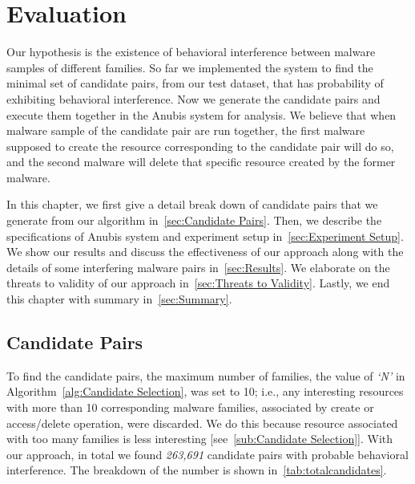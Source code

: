 \chapter{Evaluation}
\label{chapter:evaluation}
Our hypothesis is the existence of behavioral interference between malware samples of different families.
So far we implemented the system to find the minimal set of candidate pairs, from our test dataset, that has probability of exhibiting behavioral interference.
Now we generate the candidate pairs and execute them together in the Anubis system for analysis.
We believe that when malware sample of the candidate pair are run together, the first malware supposed to create the resource corresponding to the candidate pair will do so, and the second malware will delete that specific resource created by the former malware.

In this chapter, we first give a detail break down of candidate pairs that we generate from our algorithm in~\autoref{sec:Candidate Pairs}.
Then, we describe the specifications of Anubis system and experiment setup in~\autoref{sec:Experiment Setup}.
We show our results and discuss the effectiveness of our approach along with the details of some interfering malware pairs in~\autoref{sec:Results}.
We elaborate on the threats to validity of our approach in~\autoref{sec:Threats to Validity}.
Lastly, we end this chapter with summary in~\autoref{sec:Summary}.

\section{Candidate Pairs}
\label{sec:Candidate Pairs}
To find the candidate pairs, the maximum number of families, the value of \emph{`N'} in Algorithm~\autoref{alg:Candidate Selection}, was set to 10;
i.e., any interesting resources with more than 10 corresponding malware families, associated by create or access/delete operation, were discarded.
We do this because resource associated with too many families is less interesting [see~\autoref{sub:Candidate Selection}].
With our approach, in total we found \emph{263,691} candidate pairs with probable behavioral interference.
The breakdown of the number is shown in~\autoref{tab:totalcandidates}.

